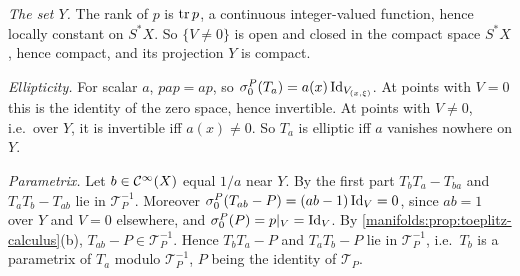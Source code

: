 \emph{The set $Y$.} The rank of $p$ is $\operatorname{tr} p$, a continuous integer-valued function, hence
locally constant on $S^*X$. So $\{V\ne0\}$ is open and closed in the compact space $S^*X$,
hence compact, and its projection $Y$ is compact.

\emph{Ellipticity.} For scalar $a$, $pap=ap$, so $\sigma^P_0(T_a)=a(x)\operatorname{Id}_{V_{(x,\xi)}}$. At points
with $V=0$ this is the identity of the zero space, hence invertible. At points with $V\ne0$,
i.e.\ over $Y$, it is invertible iff $a(x)\ne0$. So $T_a$ is elliptic iff $a$ vanishes nowhere on
$Y$.

\emph{Parametrix.} Let $b\in\mathcal{C}^\infty(X)$ equal $1/a$ near $Y$. By the first part
$T_bT_a-T_{ba}$ and $T_aT_b-T_{ab}$ lie in $\mathcal T^{-1}_P$. Moreover
$\sigma^P_0(T_{ab}-P)=(ab-1)\operatorname{Id}_V=0$, since $ab=1$ over $Y$ and $V=0$ elsewhere, and
$\sigma^P_0(P)=p|_V=\operatorname{Id}_V$. By \cref{manifolds:prop:toeplitz-calculus}(b),
$T_{ab}-P\in\mathcal T^{-1}_P$. Hence $T_bT_a-P$ and $T_aT_b-P$ lie in $\mathcal T^{-1}_P$, i.e.\ $T_b$ is a
parametrix of $T_a$ modulo $\mathcal T^{-1}_P$, $P$ being the identity of $\mathcal T_P$.
